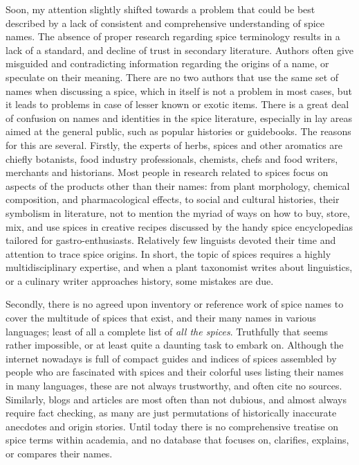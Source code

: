 Soon, my attention slightly shifted towards a problem that could be best described by a lack of consistent and comprehensive understanding of spice names. The absence of proper research regarding spice terminology results in a lack of a standard, and decline of trust in secondary literature. Authors often give misguided and contradicting information regarding the origins of a name, or speculate on their meaning. There are no two authors that use the same set of names when discussing a spice, which in itself is not a problem in most cases, but it leads to problems in case of lesser known or exotic items. There is a great deal of confusion on names and identities in the spice literature, especially in lay areas aimed at the general public, such as popular histories or guidebooks. The reasons for this are several.
Firstly, the experts of herbs, spices and other aromatics are chiefly botanists, food industry professionals, chemists, chefs and food writers, merchants and historians. Most people in research related to spices focus on aspects of the products other than their names: from plant morphology, chemical composition, and pharmacological effects, to social and cultural histories, their symbolism in literature, not to mention the myriad of ways on how to buy, store, mix, and use spices in creative recipes discussed by the handy spice encyclopedias tailored for gastro-enthusiasts. Relatively few linguists devoted their time and attention to trace spice origins. In short, the topic of spices requires a highly multidisciplinary expertise, and when a plant taxonomist writes about linguistics, or a culinary writer approaches history, some mistakes are due. 

Secondly, there is no agreed upon inventory or reference work of spice names to cover the multitude of spices that exist, and their many names in various languages; least of all a complete list of \emph{all the spices}. Truthfully that seems rather impossible, or at least quite a daunting task to embark on. Although the internet nowadays is full of compact guides and indices of spices assembled by people who are fascinated with spices and their colorful uses listing their names in many languages, these are not always trustworthy, and often cite no sources. Similarly, blogs and articles are most often than not dubious, and almost always require fact checking, as many are just permutations of historically inaccurate anecdotes and origin stories.
Until today there is no comprehensive treatise on spice terms within academia, and no database that focuses on, clarifies, explains, or compares their names.

